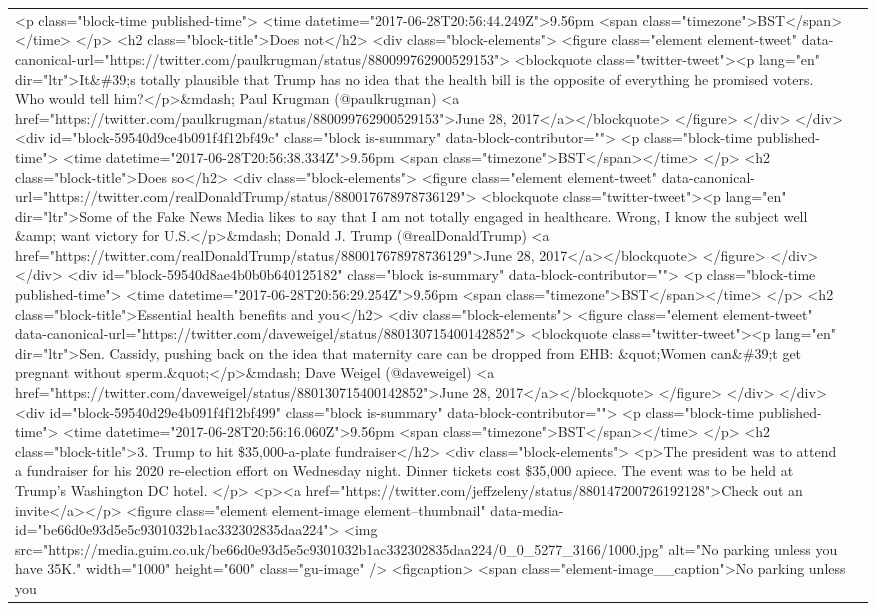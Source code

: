 \documentclass[]{article}
\begin{document}
\begin{table}[!h]
{\begin{tabular}[t]{ll}
<p class="block-time published-time"> <time datetime="2017-06-28T20:56:44.249Z">9.56pm <span class="timezone">BST</span></time> </p>   <h2 class="block-title">Does not</h2>  <div class="block-elements">  <figure class="element element-tweet" data-canonical-url="https://twitter.com/paulkrugman/status/880099762900529153">  <blockquote class="twitter-tweet"><p lang="en" dir="ltr">It\&\#39;s totally plausible that Trump has no idea that the health bill is the opposite of everything he promised voters. Who would tell him?</p>\&mdash; Paul Krugman (@paulkrugman) <a href="https://twitter.com/paulkrugman/status/880099762900529153">June 28, 2017</a></blockquote>  </figure> </div>   </div> <div id="block-59540d9ce4b091f4f12bf49c" class="block is-summary" data-block-contributor=""> <p class="block-time published-time"> <time datetime="2017-06-28T20:56:38.334Z">9.56pm <span class="timezone">BST</span></time> </p>   <h2 class="block-title">Does so</h2>  <div class="block-elements">  <figure class="element element-tweet" data-canonical-url="https://twitter.com/realDonaldTrump/status/880017678978736129">  <blockquote class="twitter-tweet"><p lang="en" dir="ltr">Some of the Fake News Media likes to say that I am not totally engaged in healthcare. Wrong, I know the subject well \&amp; want victory for U.S.</p>\&mdash; Donald J. Trump (@realDonaldTrump) <a href="https://twitter.com/realDonaldTrump/status/880017678978736129">June 28, 2017</a></blockquote>  </figure> </div>   </div> <div id="block-59540d8ae4b0b0b640125182" class="block is-summary" data-block-contributor=""> <p class="block-time published-time"> <time datetime="2017-06-28T20:56:29.254Z">9.56pm <span class="timezone">BST</span></time> </p>   <h2 class="block-title">Essential health benefits and you</h2>  <div class="block-elements">  <figure class="element element-tweet" data-canonical-url="https://twitter.com/daveweigel/status/880130715400142852">  <blockquote class="twitter-tweet"><p lang="en" dir="ltr">Sen. Cassidy, pushing back on the idea that maternity care can be dropped from EHB: \&quot;Women can\&\#39;t get pregnant without sperm.\&quot;</p>\&mdash; Dave Weigel (@daveweigel) <a href="https://twitter.com/daveweigel/status/880130715400142852">June 28, 2017</a></blockquote>  </figure> </div>   </div> <div id="block-59540d29e4b091f4f12bf499" class="block is-summary" data-block-contributor=""> <p class="block-time published-time"> <time datetime="2017-06-28T20:56:16.060Z">9.56pm <span class="timezone">BST</span></time> </p>   <h2 class="block-title">3. Trump to hit \$35,000-a-plate fundraiser</h2>  <div class="block-elements">  <p>The president was to attend a fundraiser for his 2020 re-election effort on Wednesday night. Dinner tickets cost \$35,000 apiece. The event was to be held at Trump’s Washington DC hotel. </p> <p><a href="https://twitter.com/jeffzeleny/status/880147200726192128">Check out an invite</a></p>  <figure class="element element-image element--thumbnail" data-media-id="be66d0e93d5e5c9301032b1ac332302835daa224"> <img src="https://media.guim.co.uk/be66d0e93d5e5c9301032b1ac332302835daa224/0\_0\_5277\_3166/1000.jpg" alt="No parking unless you have 35K." width="1000" height="600" class="gu-image" /> <figcaption> <span class="element-image\_\_caption">No parking unless you 
\end{tabular}}
\end{table}
\end{document}
